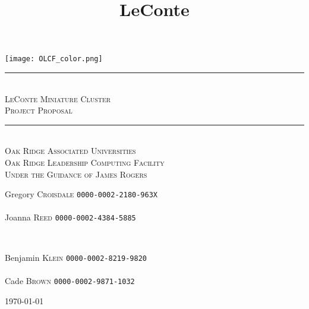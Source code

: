 \documentclass{article}
\title{LeConte}
\begin{document}
\begin{titlepage}
 \center
 \texttt{[image: OLCF\_color.png]}\\[2cm]
 \newcommand{\sep}{\rule{\linewidth}{0.5mm}}
 \sep \\[0.4cm]
 \textsc{\huge LeConte Miniature Cluster}\\[0.4cm]
 \textsc{\large Project Proposal}\\[0.4cm]
 \sep \\[2cm]
 \textsc{\LARGE Oak Ridge Associated Universities}\\[0.5cm]
 \textsc{\Large Oak Ridge Leadership Computing Facility}\\[0.5cm]
 \textsc{\large Under the Guidance of James Rogers}\\[4.6cm]

\vfill
\begin{minipage}{0.4\textwidth}
\begin{flushleft} \large
Gregory \textsc{Croisdale} \texttt{0000-0002-2180-963X}\\~\\
Joanna \textsc{Reed} \texttt{0000-0002-4384-5885}\\
\end{flushleft}
\end{minipage}
~
\begin{minipage}{0.4\textwidth}
\begin{flushright} \large
Benjamin \textsc{Klein} \texttt{0000-0002-8219-9820}\\~\\
Cade \textsc{Brown} \texttt{0000-0002-9871-1032}\\
\end{flushright}
\end{minipage}
{\large \vfill \vspace*{\fill} \today}
\end{titlepage}
\end{document}
